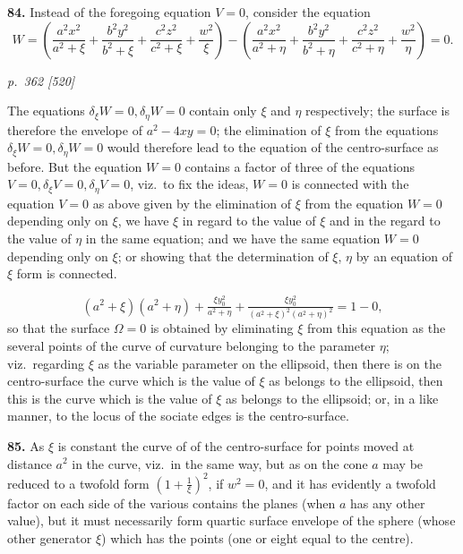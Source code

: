 \documentclass[11pt,a4paper]{book}
\begin{document}
\textbf{84.} Instead of the foregoing equation $V = 0$, consider the equation
\[
W = \left(\frac{a^2 x^2}{a^2 + \xi} + \frac{b^2 y^2}{b^2 + \xi} + \frac{c^2 z^2}{c^2 + \xi} + \frac{w^2}{\xi}\right) - \left(\frac{a^2 x^2}{a^2 + \eta} + \frac{b^2 y^2}{b^2 + \eta} + \frac{c^2 z^2}{c^2 + \eta} + \frac{w^2}{\eta}\right) = 0.
\]

\clearpage

\bigskip
\textit{p.~362 [520]}
\smallskip

The equations $\delta_\xi W = 0, \delta_\eta W = 0$ contain only $\xi$ and $\eta$ respectively; the surface is therefore the envelope of $a^2 - 4xy = 0$; the elimination of $\xi$ from the equations $\delta_\xi W = 0, \delta_\eta W = 0$ would therefore lead to the equation of the centro-surface as before. But the equation $W = 0$ contains a factor of three of the equations $V = 0, \delta_\xi V = 0, \delta_\eta V = 0$, viz.\ to fix the ideas, $W = 0$ is connected with the equation $V = 0$ as above given by the elimination of $\xi$ from the equation $W = 0$ depending only on $\xi$, we have $\xi$ in regard to the value of $\xi$ and in the regard to the value of $\eta$ in the same equation; and we have the same equation $W = 0$ depending only on $\xi$; or showing that the determination of $\xi$, $\eta$ by an equation of $\xi$ form is connected.

\[
(a^2 + \xi)(a^2 + \eta) + \tfrac{\xi y_0^2}{a^2 + \eta} + \tfrac{\xi y_0^2}{(a^2 + \xi)^2(a^2 + \eta)^2} = 1 - 0,
\]
so that the surface $\Omega = 0$ is obtained by eliminating $\xi$ from this equation as the several points of the curve of curvature belonging to the parameter $\eta$; viz.\ regarding $\xi$ as the variable parameter on the ellipsoid, then there is on the centro-surface the curve which is the value of $\xi$ as belongs to the ellipsoid, then this is the curve which is the value of $\xi$ as belongs to the ellipsoid; or, in a like manner, to the locus of the sociate edges is the centro-surface.

\textbf{85.} As $\xi$ is constant the curve of of the centro-surface for points moved at distance $a^2$ in the curve, viz.\ in the same way, but as on the cone $a$ may be reduced to a twofold form $\left(1 + \tfrac{1}{\xi}\right)^2$, if $w^2 = 0$, and it has evidently a twofold factor on each side of the various contains the planes (when $a$ has any other value), but it must necessarily form quartic surface envelope of the sphere (whose other generator $\xi$) which has the points (one or eight equal to the centre).
\end{document}
